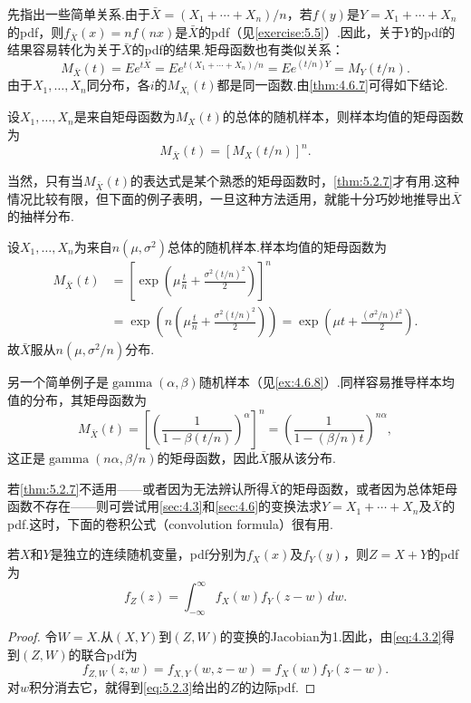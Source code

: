 先指出一些简单关系.由于$\bar X=(X_1+\cdots+X_n)/n$，若$f(y)$是$Y=X_1+\cdots+X_n$的pdf，则$f_{\bar X}(x)=nf(nx)$是$\bar X$的pdf（见\autoref{exercise:5.5}）.因此，关于$Y$的pdf的结果容易转化为关于$\bar X$的pdf的结果.矩母函数也有类似关系：
$$M_{\bar X}(t)=Ee^{t\bar X}=Ee^{t(X_1+\cdots+X_n)/n}=Ee^{(t/n)Y}=M_Y(t/n).$$
由于$X_1,\ldots,X_n$同分布，各$i$的$M_{X_i}(t)$都是同一函数.由\autoref{thm:4.6.7}可得如下结论.
\begin{theorem}\label{thm:5.2.7}
设$X_1,\ldots,X_n$是来自矩母函数为$M_X(t)$的总体的随机样本，则样本均值的矩母函数为
$$M_{\bar X}(t)=[M_X(t/n)]^n.$$
\end{theorem}
当然，只有当$M_{\bar X}(t)$的表达式是某个熟悉的矩母函数时，\autoref{thm:5.2.7}才有用.这种情况比较有限，但下面的例子表明，一旦这种方法适用，就能十分巧妙地推导出$\bar X$的抽样分布.
\begin{example}[均值的分布]\label{ex:5.2.8}
设$X_1,\ldots,X_n$为来自$n(\mu,\sigma^2)$总体的随机样本.样本均值的矩母函数为
\begin{align*}
M_{\bar X}(t)&=\left[\exp\left(\mu\frac tn+\frac{\sigma^2(t/n)^2}{2}\right)\right]^n\\
&=\exp\left(n\left(\mu\frac tn+\frac{\sigma^2(t/n)^2}{2}\right)\right)=\exp\left(\mu t+\frac{(\sigma^2/n)t^2}{2}\right).
\end{align*}
故$\bar X$服从$n(\mu,\sigma^2/n)$分布.

另一个简单例子是$\operatorname{gamma}(\alpha,\beta)$随机样本（见\autoref{ex:4.6.8}）.同样容易推导样本均值的分布，其矩母函数为
$$M_{\bar X}(t)=\left[\left(\frac1{1-\beta(t/n)}\right)^\alpha\right]^n=\left(\frac1{1-(\beta/n)t}\right)^{n\alpha},$$
这正是$\operatorname{gamma}(n\alpha,\beta/n)$的矩母函数，因此$\bar X$服从该分布.
\end{example}
若\autoref{thm:5.2.7}不适用——或者因为无法辨认所得$\bar X$的矩母函数，或者因为总体矩母函数不存在——则可尝试用\autoref{sec:4.3}和\autoref{sec:4.6}的变换法求$Y=X_1+\cdots+X_n$及$\bar X$的pdf.这时，下面的卷积公式（convolution formula）很有用.
\begin{theorem}\label{thm:5.2.9}
若$X$和$Y$是独立的连续随机变量，pdf分别为$f_X(x)$及$f_Y(y)$，则$Z=X+Y$的pdf为
\begin{equation}\label{eq:5.2.3}
f_Z(z)=\int_{-\infty}^\infty f_X(w)f_Y(z-w)\,dw.
\end{equation}
\end{theorem}
\begin{proof}
令$W=X$.从$(X,Y)$到$(Z,W)$的变换的Jacobian为1.因此，由\eqref{eq:4.3.2}得到$(Z,W)$的联合pdf为
$$f_{Z,W}(z,w)=f_{X,Y}(w,z-w)=f_X(w)f_Y(z-w).$$
对$w$积分消去它，就得到\eqref{eq:5.2.3}给出的$Z$的边际pdf.
\end{proof}
